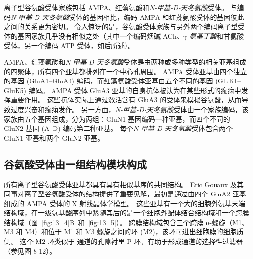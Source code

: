 离子型谷氨酸受体家族包括 AMPA、红藻氨酸和\textit{N-甲基-D-天冬氨酸}受体。
与编码\textit{N-甲基-D-天冬氨酸}受体的基因相比，编码 AMPA 和红藻氨酸受体的基因彼此之间的关系更为密切。
令人惊讶的是，谷氨酸受体家族与另外两个编码离子型受体的基因家族几乎没有相似之处（其中一个编码烟碱 ACh、\textit{$\gamma$-氨基丁酸}和甘氨酸受体，另一个编码 ATP 受体，如后所述）。


AMPA、红藻氨酸和\textit{N-甲基-D-天冬氨酸}受体是由两种或多种类型的相关亚基组成的四聚体，所有四个亚基都排列在一个中心孔周围。
AMPA 受体亚基由四个独立的基因 (GluA1–GluA4) 编码，而红藻氨酸受体亚基由五个不同的基因 (GluK1–GluK5) 编码。
AMPA 受体 GluA3 亚基的自身抗体被认为在某些形式的癫痫中发挥重要作用。
这些抗体实际上通过激活含有 GluA3 的受体来模拟谷氨酸，从而导致过度兴奋和癫痫发作。
另一方面，\textit{N-甲基-D-天冬氨酸}受体由一个家族编码，该家族由五个基因组成，分为两组：GluN1 基因编码一种亚基，而四个不同的 GluN2 基因 (A–D) 编码第二种亚基。
每个\textit{N-甲基-D-天冬氨酸}受体包含两个 GluN1 亚基和两个 GluN2 亚基。



\subsection{谷氨酸受体由一组结构模块构成}

所有离子型谷氨酸受体亚基都具有具有相似基序的共同结构。
Eric Gouaux 及其同事对离子型谷氨酸受体的结构提供了重要见解，最初是通过由四个 GluA2 亚基组成的 AMPA 受体的 X 射线晶体学模型。
这些亚基有一个大的细胞外氨基末端结构域，在一级氨基酸序列中紧随其后的是一个细胞外配体结合结构域和一个跨膜结构域（图~\ref{fig:13_4}B~和~\ref{fig:13_5}）。
跨膜结构域包含三个跨膜 α-螺旋（M1、M3 和 M4）和位于 M1 和 M3 螺旋之间的环 (M2)，该环可进出细胞膜的细胞质侧。
这个 M2 环类似于  通道的孔隙衬里 P 环，有助于形成通道的选择性过滤器（参见图 8-12）。


